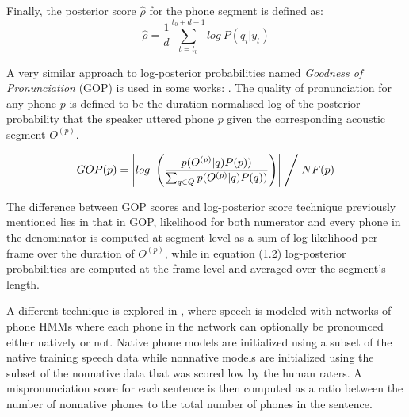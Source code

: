 Finally, the posterior score $\hat{\rho}$ for the phone segment is defined as:
\begin{equation}
\hat{\rho} = \frac{1}{d}\sum_{t=t_{0}}^{t_{0}+d-1} log \ P(q_{i}|y_{t})
\end{equation}

A very similar approach to log-posterior probabilities named \textit{Goodness of Pronunciation}
(GOP) is used in some works: \cite{gop_1} \cite{gop_2} \cite{gop_3}. The quality of 
pronunciation for any phone $p$ is defined to be the duration normalised log of the posterior
probability that the speaker uttered phone $p$ given the corresponding acoustic segment
$O^{(p)}$.

\begin{equation}
GOP(p) = \left| log \ \left(\frac{p(O^{(p)}|q)P(p))}{\sum_{q \in Q}p(O^{(p)}|q)P(q))}\right) \right| \Biggm/ NF(p)
\end{equation}

The difference between GOP scores and log-posterior score technique previously mentioned 
lies in that in GOP, likelihood for both numerator and every phone in the denominator is
computed at segment level as a sum of log-likelihood per frame over the 
duration of $O^{(p)}$, while in equation (1.2) log-posterior probabilities are computed
at the frame level and averaged over the segment's length.

A different technique is explored in \cite{detection_mispronunciation_instruction}, where
speech is modeled with networks of phone HMMs where each phone in the network can optionally
be pronounced either natively or not. Native phone models are initialized using a subset of
the native training speech data while nonnative models are initialized using the subset of 
the nonnative data that was scored low by the human raters. A mispronunciation score for each
sentence is then computed as a ratio between the number of nonnative phones to the total 
number of phones in the sentence.


